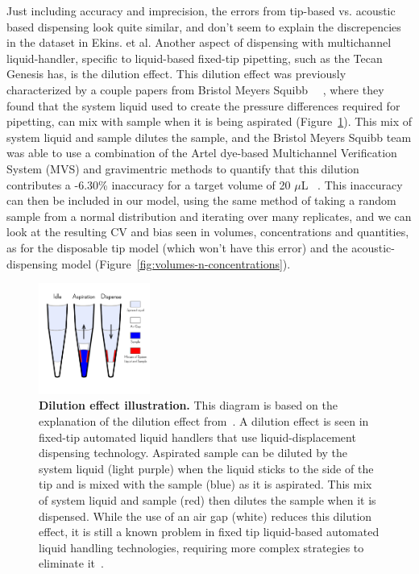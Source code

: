 \documentclass[aps,pre,twocolumn,nofootinbib,superscriptaddress,linenumbers]{revtex4-1}
\begin{document}
Just including accuracy and imprecision, the errors from tip-based vs. acoustic based dispensing look quite similar, and don't seem to explain the discrepencies in the dataset in Ekins. et al. 
Another aspect of dispensing with multichannel liquid-handler, specific to liquid-based fixed-tip pipetting, such as the Tecan Genesis has, is the dilution effect. 
This dilution effect was previously characterized by a couple papers from Bristol Meyers Squibb ~\cite{dong_use_2006}~\cite{gu_dilution_2007}, where they found that the system liquid used to create the pressure differences required for pipetting, can mix with sample when it is being aspirated (Figure~\ref{fig:dilution_effect}). 
This mix of system liquid and sample dilutes the sample, and the Bristol Meyers Squibb team was able to use a combination of the Artel dye-based Multichannel Verification System (MVS) and gravimentric methods to quantify that this dilution contributes a -6.30\% inaccuracy for a target volume of 20 $\mu$L ~\cite{dong_use_2006}.
This inaccuracy can then be included in our model, using the same method of taking a random sample from a normal distribution and iterating over many replicates, and we can look at the resulting CV and bias seen in volumes, concentrations and quantities, as for the disposable tip model (which won't have this error) and the acoustic-dispensing model (Figure~\ref{fig:volumes-n-concentrations}).

\begin{figure}[tb]
    \includegraphics[width=0.325\textwidth]{../figures/dilution_effect.pdf}

  \caption{{\bf Dilution effect illustration.}
  This diagram is based on the explanation of the dilution effect from~\cite{gu_dilution_2007}. 
  A dilution effect is seen in fixed-tip automated liquid handlers that use liquid-displacement dispensing technology. 
  Aspirated sample can be diluted by the system liquid (light purple) when the liquid sticks to the side of the tip and is mixed with the sample (blue) as it is aspirated.
  This mix of system liquid and sample (red) then dilutes the sample when it is dispensed. 
  While the use of an air gap (white) reduces this dilution effect, it is still a known problem in fixed tip liquid-based automated liquid handling technologies, requiring more complex strategies to eliminate it~\cite{gu_dilution_2007}. 
  }
  \label{fig:dilution_effect}
\end{figure}
\end{document}
